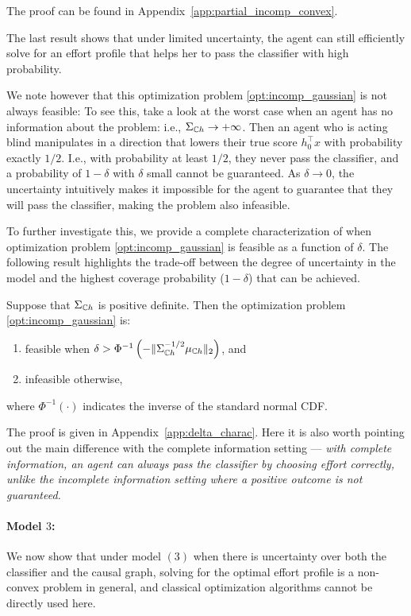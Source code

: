 The proof can be found in Appendix~\ref{app:partial_incomp_convex}.



The last result shows that under limited uncertainty, the agent can still efficiently solve for an effort profile that helps her to pass the classifier with high probability. 

\begin{remark}
We note however that this optimization problem \eqref{opt:incomp_gaussian} is not always feasible:  
To see this, take a look at the worst case when an agent has no information about the problem: i.e., $\Sigma_{\mathbb{C} h} \to +\infty$. Then an agent who is acting blind manipulates in a direction that lowers their true score $h_0^\top x$ with probability exactly $1/2$. I.e., with probability at least $1/2$, they never pass the classifier, and a probability of $1-\delta$ with $\delta$ small cannot be guaranteed. As $\delta \to 0$, the uncertainty intuitively makes it impossible for the agent to guarantee that they will pass the classifier, making the problem also infeasible. 
\end{remark}

To further investigate this, we provide a complete characterization of when optimization problem \eqref{opt:incomp_gaussian} is feasible as a function of $\delta$. The following result highlights the trade-off between the degree of uncertainty in the model and the highest coverage probability ($1-\delta$) that can be achieved.
\begin{lem}\label{lem:delta_charac}
Suppose that $\Sigma_{\mathbb{C} h}$ is positive definite. Then the optimization problem \eqref{opt:incomp_gaussian} is:
\begin{enumerate}
    \item feasible when $\delta > \Phi^{-1}\left( - \| \Sigma_{\mathbb{C} h}^{-1/2} \mu_{\mathbb{C} h} \|_2 \right)$, and
    \item infeasible otherwise, 
\end{enumerate}
where $\Phi^{-1}(\cdot)$ indicates the inverse of the standard normal CDF. 
\end{lem}

The proof is given in Appendix~\ref{app:delta_charac}. Here it is also worth pointing out the main difference with the complete information setting --- \emph{with complete information, an agent can always pass the classifier by choosing effort correctly, unlike the incomplete information setting where a positive outcome is not guaranteed.}

\paragraph{Model $3$: }We now show that under model $(3)$ when there is uncertainty over both the classifier and the causal graph, solving for the optimal effort profile is a non-convex problem in general, and classical optimization algorithms cannot be directly used here.

